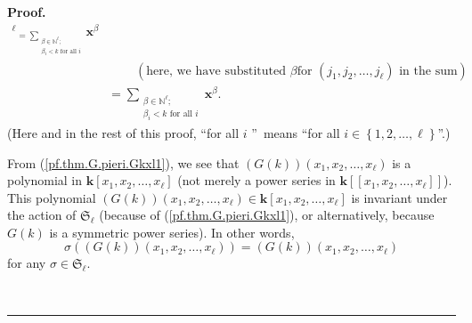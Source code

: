 \documentclass[numbers=enddot,12pt,final,onecolumn,notitlepage]{scrartcl}%
\theoremstyle{definition}
\newenvironment{proof}[1][Proof]{\noindent\textbf{#1.} }{\ \rule{0.5em}{0.5em}}
\let\sumnonlimits\sum
\renewcommand{\sum}{\sumnonlimits\limits}
\newenvironment{verlong}{}{}
\begin{document}
\begin{verlong}
\begin{proof}
\begin{align}
{{^{\ell}}}_{=\sum_{\substack{\beta\in\mathbb{N}^{\ell};\\\beta_{i}<k\text{ for
all }i}}}\mathbf{x}^{\beta}\nonumber\\
&  \ \ \ \ \ \ \ \ \ \ \left(  \text{here, we have substituted }\beta\text{
for }\left(  j_{1},j_{2},\ldots,j_{\ell}\right)  \text{ in the sum}\right)
\nonumber\\
&  =\sum_{\substack{\beta\in\mathbb{N}^{\ell};\\\beta_{i}<k\text{ for all }%
i}}\mathbf{x}^{\beta}.\nonumber
\end{align}
(Here and in the rest of this proof, \textquotedblleft for all $i$%
\textquotedblright\ means \textquotedblleft for all $i\in\left\{
1,2,\ldots,\ell\right\}  $\textquotedblright.)

From (\ref{pf.thm.G.pieri.Gkxl1}), we see that $\left(  G\left(  k\right)
\right)  \left(  x_{1},x_{2},\ldots,x_{\ell}\right)  $ is a polynomial in
$\mathbf{k}\left[  x_{1},x_{2},\ldots,x_{\ell}\right]  $ (not merely a power
series in $\mathbf{k}\left[  \left[  x_{1},x_{2},\ldots,x_{\ell}\right]
\right]  $). This polynomial $\left(  G\left(  k\right)  \right)  \left(
x_{1},x_{2},\ldots,x_{\ell}\right)  \in\mathbf{k}\left[  x_{1},x_{2}%
,\ldots,x_{\ell}\right]  $ is invariant under the action of $\mathfrak{S}%
_{\ell}$ (because of (\ref{pf.thm.G.pieri.Gkxl1}), or alternatively, because
$G\left(  k\right)  $ is a symmetric power series). In other words,%
\begin{equation}
\sigma\left(  \left(  G\left(  k\right)  \right)  \left(  x_{1},x_{2}%
,\ldots,x_{\ell}\right)  \right)  =\left(  G\left(  k\right)  \right)  \left(
x_{1},x_{2},\ldots,x_{\ell}\right)  \label{pf.thm.G.pieri.Gkxl-symm}%
\end{equation}
for any $\sigma\in\mathfrak{S}_{\ell}$.


\end{proof}
\end{verlong}
\end{document}
